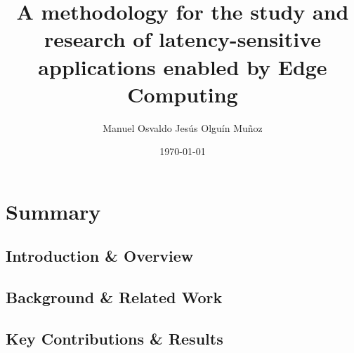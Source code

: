 \documentclass[electronic,oldfontcommands]{kthesis}
\begin{document}
\title{A methodology for the study and research of latency-sensitive applications enabled by Edge Computing}
\subtitle{{}}
\author{Manuel {Osvaldo Jesús} {Olguín Muñoz}}
\date{\today}
\address{%
	KTH Royal Institute of Technology\\%
	School of Electrical Engineering and Computer Science\\%
	Division of Information Science and Engineering\\%
	SE-10044 Stockholm\\%
	Sweden%
}

\maketitle

\frontmatter %





\mainmatter %

\tableofcontents%

\part{Summary}\label{part:summary}
\chapter{Introduction \& Overview}\label{chap:introduction}


\chapter{Background \& Related Work}\label{chap:relatedwork}


\chapter{Key Contributions \& Results}\label{chap:contributions}

\end{document}
